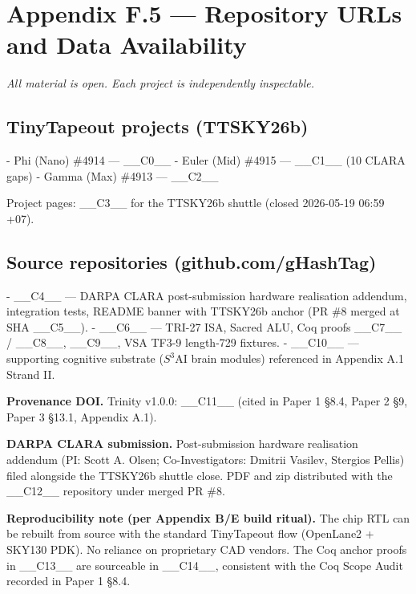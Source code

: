 
\section{Appendix F.5 --- Repository URLs and Data Availability}

\textit{All material is open. Each project is independently inspectable.}

\subsection{TinyTapeout projects (TTSKY26b)}

- Phi (Nano) \#4914 --- \_\_C0\_\_
- Euler (Mid) \#4915 --- \_\_C1\_\_ (10 CLARA gaps)
- Gamma (Max) \#4913 --- \_\_C2\_\_

Project pages: \_\_C3\_\_ for the TTSKY26b shuttle (closed 2026-05-19 06:59 +07).

\subsection{Source repositories (github.com/gHashTag)}

- \_\_C4\_\_ --- DARPA CLARA post-submission hardware realisation addendum, integration tests, README banner with TTSKY26b anchor (PR \#8 merged at SHA \_\_C5\_\_).
- \_\_C6\_\_ --- TRI-27 ISA, Sacred ALU, Coq proofs \_\_C7\_\_ / \_\_C8\_\_, \_\_C9\_\_, VSA TF3-9 length-729 fixtures.
- \_\_C10\_\_ --- supporting cognitive substrate ($S^{3}$AI brain modules) referenced in Appendix A.1 Strand II.

\textbf{Provenance DOI.} Trinity v1.0.0: \_\_C11\_\_ (cited in Paper 1 §8.4, Paper 2 §9, Paper 3 §13.1, Appendix A.1).

\textbf{DARPA CLARA submission.} Post-submission hardware realisation addendum (PI: Scott A. Olsen; Co-Investigators: Dmitrii Vasilev, Stergios Pellis) filed alongside the TTSKY26b shuttle close. PDF and zip distributed with the \_\_C12\_\_ repository under merged PR \#8.

\textbf{Reproducibility note (per Appendix B/E build ritual).} The chip RTL can be rebuilt from source with the standard TinyTapeout flow (OpenLane2 + SKY130 PDK). No reliance on proprietary CAD vendors. The Coq anchor proofs in \_\_C13\_\_ are sourceable in \_\_C14\_\_, consistent with the Coq Scope Audit recorded in Paper 1 §8.4.
